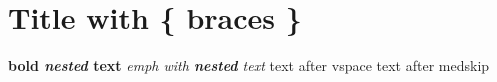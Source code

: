 
\section{Title with \{ braces \}}
\textbf{bold \emph{nested} text}
\emph{emph with \textbf{nested} text}
\vspace{1cm}text after vspace
\medskip
text after medskip
\[
\]

